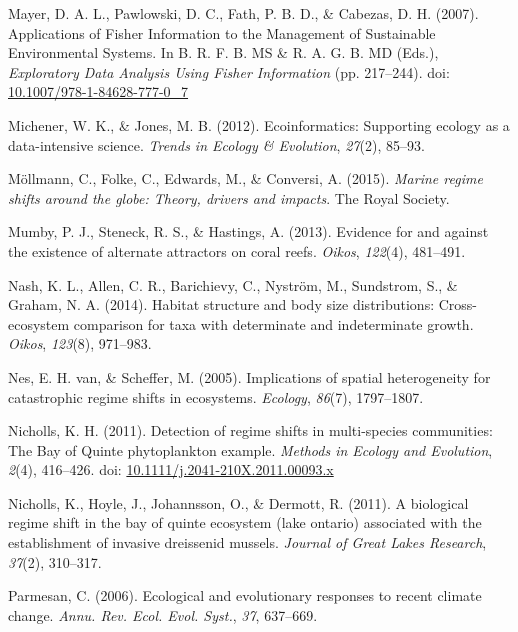 \documentclass[12pt,twoside,openany]{reedthesis}
\begin{document}
\leavevmode\hypertarget{ref-mayer_applications_2007}{}%
Mayer, D. A. L., Pawlowski, D. C., Fath, P. B. D., \& Cabezas, D. H. (2007). Applications of Fisher Information to the Management of Sustainable Environmental Systems. In B. R. F. B. MS \& R. A. G. B. MD (Eds.), \emph{Exploratory Data Analysis Using Fisher Information} (pp. 217--244). doi: \href{https://doi.org/10.1007/978-1-84628-777-0_7}{10.1007/978-1-84628-777-0\_7}

\leavevmode\hypertarget{ref-michener2012ecoinformatics}{}%
Michener, W. K., \& Jones, M. B. (2012). Ecoinformatics: Supporting ecology as a data-intensive science. \emph{Trends in Ecology \& Evolution}, \emph{27}(2), 85--93.

\leavevmode\hypertarget{ref-mollmann2015marine}{}%
Möllmann, C., Folke, C., Edwards, M., \& Conversi, A. (2015). \emph{Marine regime shifts around the globe: Theory, drivers and impacts}. The Royal Society.

\leavevmode\hypertarget{ref-mumby2013evidence}{}%
Mumby, P. J., Steneck, R. S., \& Hastings, A. (2013). Evidence for and against the existence of alternate attractors on coral reefs. \emph{Oikos}, \emph{122}(4), 481--491.

\leavevmode\hypertarget{ref-nash2014habitat}{}%
Nash, K. L., Allen, C. R., Barichievy, C., Nyström, M., Sundstrom, S., \& Graham, N. A. (2014). Habitat structure and body size distributions: Cross-ecosystem comparison for taxa with determinate and indeterminate growth. \emph{Oikos}, \emph{123}(8), 971--983.

\leavevmode\hypertarget{ref-van2005implications}{}%
Nes, E. H. van, \& Scheffer, M. (2005). Implications of spatial heterogeneity for catastrophic regime shifts in ecosystems. \emph{Ecology}, \emph{86}(7), 1797--1807.

\leavevmode\hypertarget{ref-nicholls_detection_2011}{}%
Nicholls, K. H. (2011). Detection of regime shifts in multi-species communities: The Bay of Quinte phytoplankton example. \emph{Methods in Ecology and Evolution}, \emph{2}(4), 416--426. doi: \href{https://doi.org/10.1111/j.2041-210X.2011.00093.x}{10.1111/j.2041-210X.2011.00093.x}

\leavevmode\hypertarget{ref-nicholls2011biological}{}%
Nicholls, K., Hoyle, J., Johannsson, O., \& Dermott, R. (2011). A biological regime shift in the bay of quinte ecosystem (lake ontario) associated with the establishment of invasive dreissenid mussels. \emph{Journal of Great Lakes Research}, \emph{37}(2), 310--317.

\leavevmode\hypertarget{ref-parmesan_ecological_2006}{}%
Parmesan, C. (2006). Ecological and evolutionary responses to recent climate change. \emph{Annu. Rev. Ecol. Evol. Syst.}, \emph{37}, 637--669.
\end{document}
